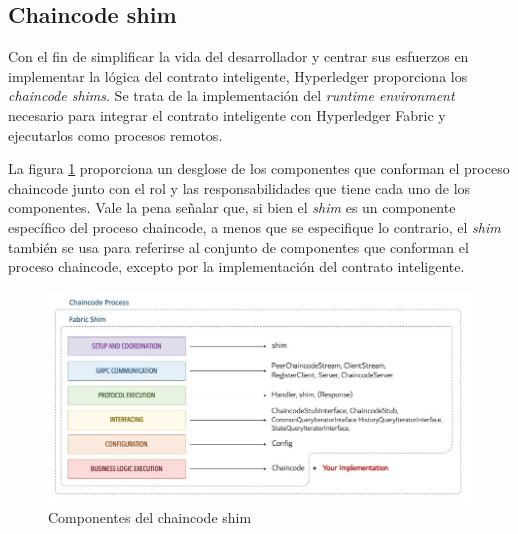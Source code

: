 
%



\subsection*{Chaincode shim}

Con el fin de simplificar la vida del desarrollador y centrar sus esfuerzos en implementar la lógica del contrato inteligente, Hyperledger proporciona los \textit{chaincode shims}. Se trata de la implementación del \textit{runtime environment} necesario para integrar el contrato inteligente con Hyperledger Fabric y ejecutarlos como procesos remotos.


La figura \ref{fig:chaincodeshim} proporciona un desglose de los componentes que conforman el proceso chaincode junto con el rol y las responsabilidades que tiene cada uno de los componentes. Vale la pena señalar que, si bien el \textit{shim} es un componente específico del proceso chaincode, a menos que se especifique lo contrario, el \textit{shim} también se usa para referirse al conjunto de componentes que conforman el proceso chaincode, excepto por la implementación del contrato inteligente.

\begin{figure}[tbph]
\centering
\includegraphics[width=\textwidth]{Images/chaincode_shim}
\caption{Componentes del chaincode shim}
\label{fig:chaincodeshim}
\end{figure}


